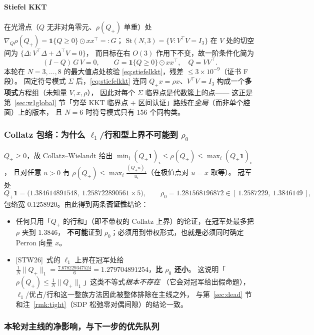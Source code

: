 \documentclass[UTF8,11pt]{ctexart}
\theoremstyle{definition}
\newcommand{\STW}{\textup{[STW26]}}
\begin{document}
\paragraph{Stiefel KKT}在光滑点（$Q$ 无非对角零元、$\rho(Q_+)$ 单重）处
$\nabla_Q\rho(Q_+)=\mathbf 1\{Q\ge0\}\odot xx^\top=:G$；
$\mathrm{St}(N,3)=\{V:V^\top V=I_3\}$ 在 $V$ 处的切空间为 $\{\Delta:V^\top\Delta+\Delta^\top V=0\}$，
而目标在右 $O(3)$ 作用下不变，故一阶条件化简为
\begin{equation}\label{eq:stiefelkkt}
(I-Q)\,G\,V=0,\qquad G=\mathbf 1\{Q\ge0\}\odot xx^\top,\quad Q=VV^\top .
\end{equation}
本轮在 $N=3,\dots,8$ 的最大值点处核验 \eqref{eq:stiefelkkt}，残差 $\le3\times10^{-9}$（证书 F 段）。
固定符号模式 $\Sigma$ 后，\eqref{eq:stiefelkkt} 连同 $Q_+x=\rho x$、$V^\top V=I_3$
构成一个\textbf{多项式}方程组（未知量 $V,x,\rho$），
因此对每个 $\Sigma$ 临界点是代数簇上的点——
这正是第~\ref{sec:w1global} 节「穷举 KKT 临界点 $+$ 区间认证」路线在\emph{全局}（而非单个腔面）上的版本，
且 $N=6$ 时符号模式只有 $156$ 个同构类。

\subsubsection{Collatz 包络：为什么 $\ell_1$/行和型上界不可能到 $\rho_0$}

$Q_+\ge0$，故 Collatz--Wielandt 给出
$\min_i(Q_+\mathbf 1)_i\le\rho(Q_+)\le\max_i(Q_+\mathbf 1)_i$，
且对任意 $u>0$ 有 $\rho(Q_+)\le\max_i\frac{(Q_+u)_i}{u_i}$（在极值点对 $u=x$ 取等）。
冠军处
\[
Q_+\mathbf 1=\bigl(1.384614891548,\ 1.258722890561\times5\bigr),\qquad
\rho_0=1.281568196872\in[\,1.2587229,\ 1.3846149\,],
\]
包络宽 $0.1258920$。由此得到两条\textbf{否证性}结论：
\begin{itemize}[leftmargin=1.6em,itemsep=1pt]
\item 任何只用「$Q_+$ 的行和」（即不带权的 Collatz 上界）的论证，在冠军处最多把 $\rho$ 夹到 $1.3846$，
\textbf{不可能}证到 $\rho_0$；必须用到带权形式，也就是必须同时确定 Perron 向量 $x$。
\item \STW\ 式的 $\ell_1$ 上界在冠军处给
$\frac1N\|Q_+\|_1=\frac{7.678229347524}{6}=1.279704891254$，\textbf{比 $\rho_0$ 还小}。
这说明「$\rho(Q_+)\le\frac1N\|Q_+\|_1$」这类不等式\emph{根本不存在}
（它会对冠军给出假命题），$\ell_1$/优占/行和这一整族方法因此被整体排除在主线之外，
与第~\ref{sec:dead} 节和注~\ref{rmk:tight}（SDP 松弛零对偶间隙）的结论一致。
\end{itemize}

\subsubsection{本轮对主线的净影响，与下一步的优先队列}
\end{document}
